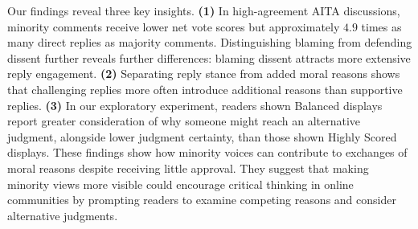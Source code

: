 Our findings reveal three key insights. \textbf{(1)} In high-agreement AITA discussions, minority comments receive lower net vote scores but approximately $4.9$ times as many direct replies as majority comments. Distinguishing blaming from defending dissent further reveals further differences: blaming dissent attracts more extensive reply engagement. \textbf{(2)} Separating reply stance from added moral reasons shows that challenging replies more often introduce additional reasons than supportive replies. \textbf{(3)} In our exploratory experiment, readers shown Balanced displays report greater consideration of why someone might reach an alternative judgment, alongside lower judgment certainty, than those shown Highly Scored displays.
These findings show how minority voices can contribute to exchanges
of moral reasons despite receiving little approval. 
They suggest that making minority views more visible could encourage critical
thinking in online communities by prompting readers to examine
competing reasons and consider alternative judgments.

